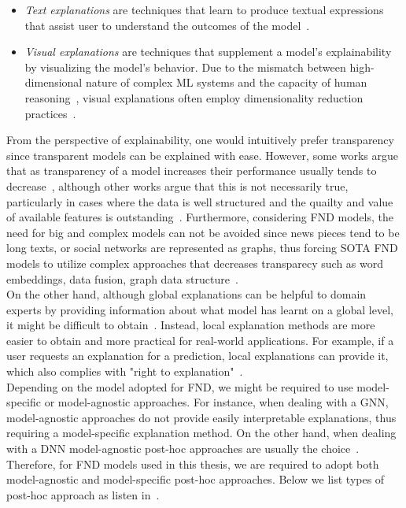 \begin{itemize}
    \item \emph{Text explanations} are techniques that learn to produce textual expressions that assist user to understand the outcomes of the model~\parencite{TowardsExplainableNeuralSymbolic_Bennetot}.
    \item \emph{Visual explanations} are techniques that supplement a model's explainability by visualizing the model's behavior. Due to the mismatch between high-dimensional nature of  complex ML systems and the capacity of human reasoning~\parencite{HowTheMachineThinks_Burrell}, visual explanations often employ dimensionality reduction practices~\parencite{XAIConceptsTaxonomies_Arrieta}.
\end{itemize}
From the perspective of explainability, one would intuitively prefer transparency since transparent models
can be explained with ease. However, some works argue that as transparency of a model increases their performance usually tends to decrease~\parencite{ExplaniableAIASurvey_Dosilovic}, although other works argue that this is not necessarily true, particularly in cases where the data is well structured and the quailty and value of available features is outstanding~\parencite{StopExplainingBlackBoxmodels_Rudin}. Furthermore, considering FND models, the
need for big and complex models can not be avoided since news pieces tend to be long texts, or social networks are represented as graphs, thus forcing SOTA FND models to utilize complex approaches that decreases transparecy such as word embeddings, data fusion, graph data structure~\parencite{UPFD_Dataset_Shu}.\\
On the other hand, although global explanations can be helpful to domain experts by providing information about what model has learnt on a global level, it might be difficult to obtain~\parencite{TheMythosOfModelInterpretability_Lipton}. Instead, local explanation methods are more easier to obtain and more practical for real-world applications. For example, if a user requests an explanation for a prediction, local explanations can provide it, which also complies with "right to explanation"~\parencite{EURegulationsOnDecisionMaking_Goodman}.\\
Depending on the model adopted for FND, we might be required to use model-specific or model-agnostic approaches. For instance, when dealing with a GNN, model-agnostic approaches do not provide easily interpretable explanations, thus requiring a model-specific explanation method. On the other hand, when dealing with a DNN model-agnostic post-hoc approaches are usually the choice~\parencite{XAIConceptsTaxonomies_Arrieta}. Therefore, for FND models used in this thesis, we are required to adopt both model-agnostic and model-specific post-hoc approaches. Below we list types of post-hoc approach as listen in~\parencite{XAIConceptsTaxonomies_Arrieta}.
